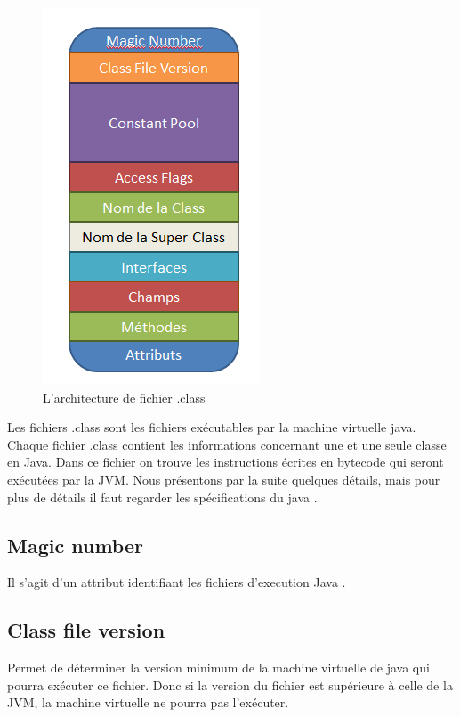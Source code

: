 \documentclass[12pt, a4paper, one side]{article}
\begin{document}
    \begin{figure}[h]
        \centering
        \includegraphics[scale=0.80]{JavaInternal.png}
        \caption{L'architecture de fichier .class \cite{ref_DexFormatvsJavabytecode}}
        \label{fig1}
    \end{figure}


    Les fichiers .class sont les fichiers exécutables par la machine virtuelle java. Chaque fichier .class contient les informations concernant une et une seule classe en Java. Dans ce fichier on trouve les instructions écrites en bytecode qui seront exécutées par la JVM. Nous présentons par la suite quelques détails, mais pour plus de détails il faut regarder les spécifications du java \cite{ref_specifications_java} .

    \subsection{Magic number}
    Il s'agit d'un attribut identifiant les fichiers d'execution Java \cite{ref_DexFormatvsJavabytecode}.

    \subsection{Class file version}
    Permet de déterminer la version minimum de la machine virtuelle de java qui pourra exécuter ce fichier. Donc si la version du fichier est supérieure à celle de la JVM, la machine virtuelle ne pourra pas l'exécuter.
\end{document}
